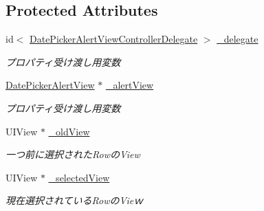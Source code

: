 \subsection*{Protected Attributes}
\begin{DoxyCompactItemize}
\item 
\hypertarget{interface_date_picker_alert_view_controller_af80bccfe259ac0f7907fbb3f623110ab}{
id$<$ \hyperlink{protocol_date_picker_alert_view_controller_delegate-p}{DatePickerAlertViewControllerDelegate} $>$ \hyperlink{interface_date_picker_alert_view_controller_af80bccfe259ac0f7907fbb3f623110ab}{\_\-delegate}}
\label{interface_date_picker_alert_view_controller_af80bccfe259ac0f7907fbb3f623110ab}

\begin{DoxyCompactList}\small\item\em プロパティ受け渡し用変数 \end{DoxyCompactList}\item 
\hypertarget{interface_date_picker_alert_view_controller_ae924379969d3c4411771534eb6eddf69}{
\hyperlink{interface_date_picker_alert_view}{DatePickerAlertView} $\ast$ \hyperlink{interface_date_picker_alert_view_controller_ae924379969d3c4411771534eb6eddf69}{\_\-alertView}}
\label{interface_date_picker_alert_view_controller_ae924379969d3c4411771534eb6eddf69}

\begin{DoxyCompactList}\small\item\em プロパティ受け渡し用変数 \end{DoxyCompactList}\item 
\hypertarget{interface_date_picker_alert_view_controller_a8b6c7d66a0af5481421f00a8c46c0a97}{
UIView $\ast$ \hyperlink{interface_date_picker_alert_view_controller_a8b6c7d66a0af5481421f00a8c46c0a97}{\_\-oldView}}
\label{interface_date_picker_alert_view_controller_a8b6c7d66a0af5481421f00a8c46c0a97}

\begin{DoxyCompactList}\small\item\em 一つ前に選択されたRowのView \end{DoxyCompactList}\item 
\hypertarget{interface_date_picker_alert_view_controller_a9a66593d267ac3c78779d2dc9be9bee4}{
UIView $\ast$ \hyperlink{interface_date_picker_alert_view_controller_a9a66593d267ac3c78779d2dc9be9bee4}{\_\-selectedView}}
\label{interface_date_picker_alert_view_controller_a9a66593d267ac3c78779d2dc9be9bee4}

\begin{DoxyCompactList}\small\item\em 現在選択されているRowのVieｗ \end{DoxyCompactList}\end{DoxyCompactItemize}

